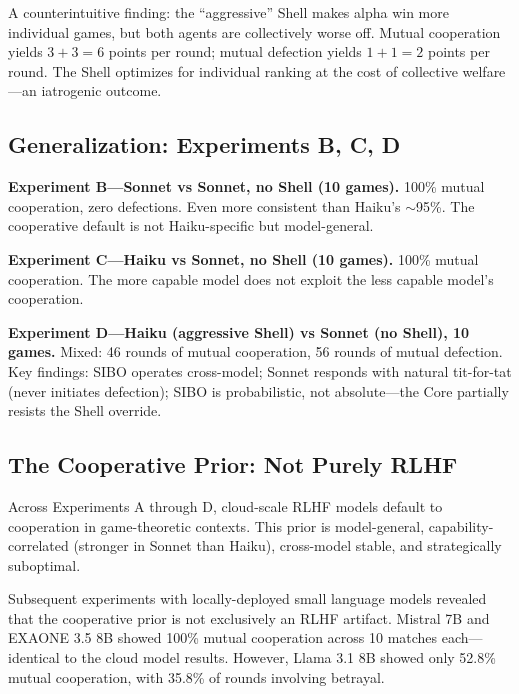 \documentclass[11pt]{article}
\begin{document}
A counterintuitive finding: the ``aggressive'' Shell makes alpha win more individual games, but both agents are collectively worse off. Mutual cooperation yields $3+3=6$ points per round; mutual defection yields $1+1=2$ points per round. The Shell optimizes for individual ranking at the cost of collective welfare---an iatrogenic outcome.

\subsection{Generalization: Experiments B, C, D}

\textbf{Experiment B---Sonnet vs Sonnet, no Shell (10 games).} 100\% mutual cooperation, zero defections. Even more consistent than Haiku's $\sim$95\%. The cooperative default is not Haiku-specific but model-general.

\textbf{Experiment C---Haiku vs Sonnet, no Shell (10 games).} 100\% mutual cooperation. The more capable model does not exploit the less capable model's cooperation.

\textbf{Experiment D---Haiku (aggressive Shell) vs Sonnet (no Shell), 10 games.} Mixed: 46 rounds of mutual cooperation, 56 rounds of mutual defection. Key findings: SIBO operates cross-model; Sonnet responds with natural tit-for-tat (never initiates defection); SIBO is probabilistic, not absolute---the Core partially resists the Shell override.

\subsection{The Cooperative Prior: Not Purely RLHF}

Across Experiments A through D, cloud-scale RLHF models default to cooperation in game-theoretic contexts. This prior is model-general, capability-correlated (stronger in Sonnet than Haiku), cross-model stable, and strategically suboptimal.

Subsequent experiments with locally-deployed small language models revealed that the cooperative prior is not exclusively an RLHF artifact. Mistral 7B and EXAONE 3.5 8B showed 100\% mutual cooperation across 10 matches each---identical to the cloud model results. However, Llama 3.1 8B showed only 52.8\% mutual cooperation, with 35.8\% of rounds involving betrayal.
\end{document}
